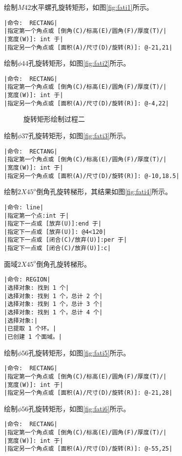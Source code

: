 \begin{procedure}
绘制$M42$水平螺孔旋转矩形，如图\ref{fig:fati1}所示。
\begin{lstlisting}
|命令:  RECTANG|
|指定第一个角点或 [倒角(C)/标高(E)/圆角(F)/厚度(T)/|
|宽度(W)]: int 于|
|指定另一个角点或 [面积(A)/尺寸(D)/旋转(R)]: @-21,21|
\end{lstlisting}
绘制$\phi 44$孔旋转矩形，如图\ref{fig:fati2}所示。
\begin{lstlisting}
|命令:  RECTANG|
|指定第一个角点或 [倒角(C)/标高(E)/圆角(F)/厚度(T)/|
|宽度(W)]: int 于|
|指定另一个角点或 [面积(A)/尺寸(D)/旋转(R)]: @-4,22|
\end{lstlisting}
\begin{figure}[htbp]
\centering
{}\hspace{30pt}
\hspace{30pt}
\caption{旋转矩形绘制过程二}
\end{figure}
绘制$\phi 37$孔旋转矩形，如图\ref{fig:fati3}所示。
\begin{lstlisting}
|命令:  RECTANG|
|指定第一个角点或 [倒角(C)/标高(E)/圆角(F)/厚度(T)/|
|宽度(W)]: int 于|
|指定另一个角点或 [面积(A)/尺寸(D)/旋转(R)]: @-10,18.5|
\end{lstlisting}
绘制$2X45^o$倒角孔旋转梯形，其结果如图\ref{fig:fati4}所示。
\begin{lstlisting}
|命令: line|
|指定第一个点:int 于|
|指定下一点或 [放弃(U)]:end 于|
|指定下一点或 [放弃(U)]: @4<120|
|指定下一点或 [闭合(C)/放弃(U)]:per 于|
|指定下一点或 [闭合(C)/放弃(U)]:c|
\end{lstlisting}
面域$2X45^o$倒角孔旋转梯形。
\begin{lstlisting}
|命令: REGION|
|选择对象: 找到 1 个|
|选择对象: 找到 1 个，总计 2 个|
|选择对象: 找到 1 个，总计 3 个|
|选择对象: 找到 1 个，总计 4 个|
|选择对象:|
|已提取 1 个环。|
|已创建 1 个面域。|
\end{lstlisting}
绘制$\phi 56$孔旋转矩形，如图\ref{fig:fati5}所示。
\begin{lstlisting}
|命令:  RECTANG|
|指定第一个角点或 [倒角(C)/标高(E)/圆角(F)/厚度(T)/|
|宽度(W)]: int 于|
|指定另一个角点或 [面积(A)/尺寸(D)/旋转(R)]: @-21,28|
\end{lstlisting}
绘制$\phi 56$孔旋转矩形，如图\ref{fig:fati6}所示。
\begin{lstlisting}
|命令:  RECTANG|
|指定第一个角点或 [倒角(C)/标高(E)/圆角(F)/厚度(T)/|
|宽度(W)]: int 于|
|指定另一个角点或 [面积(A)/尺寸(D)/旋转(R)]: @-55,25|

\end{lstlisting}
\end{procedure}
